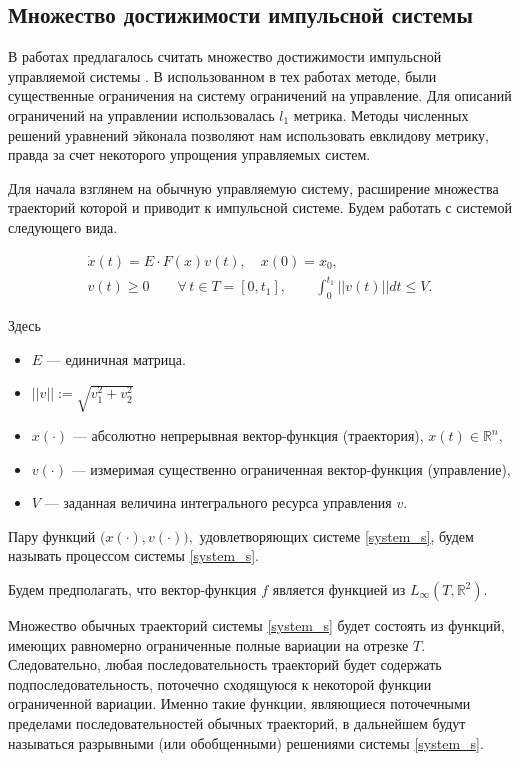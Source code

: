 \subsection{Множество достижимости импульсной системы}
\label{sec:ids}

В работах \cite{AVS2016, AV2015_1,AV2015_2} предлагалось считать
множество достижимости импульсной управляемой системы \cite{D2003}. В
использованном в тех работах методе, были существенные ограничения на
систему ограничений на управление. Для описаний ограничений на
управлении использовалась $l_1$ метрика. Методы численных решений
уравнений эйконала позволяют нам использовать евклидову метрику,
правда за счет некоторого упрощения управляемых систем.

Для начала взглянем на обычную управляемую систему, расширение
множества траекторий которой и приводит к импульсной системе. Будем
работать с системой следующего вида. 

\begin{equation}
  \label{system_s}
  \begin{array}{l}
    \dot{x}(t)=E \cdot F(x)v(t), \quad x(0)=x_0, \\[8pt]
    v(t)\geq 0  \qquad \forall\, t\in T = [0,t_1], \qquad
    \displaystyle\int_{0}^{t_1} ||v(t)||dt\leq V.
  \end{array} 
\end{equation}

Здесь
\begin{itemize}
  \item $E$ --- единичная матрица.
  \item $||v||:=\sqrt{v_1^2+v_2^2}$
  \item $x(\cdot)$ --- абсолютно непрерывная вектор-функция
    (траектория), $x(t)\in {\mathbb R}^n,$
  \item $v(\cdot)$ --- измеримая существенно ограниченная
    вектор-функция (управление),
  
  \item $V$ --- заданная величина интегрального ресурса управления
    $v$.
\end{itemize}

Пару функций $\bigl(x(\cdot),v(\cdot)\bigr),$ удовлетворяющих
системе \eqref{system_s}, будем называть процессом системы \eqref{system_s}.

Будем предполагать, что вектор-функция $f$ является функцией из
$L_{\infty}(T,\mathbb{R}^2)$.
     
Множество обычных траекторий системы \eqref{system_s} будет состоять
из функций, имеющих равномерно ограниченные полные вариации на отрезке
$T$. Следовательно, любая последовательность траекторий будет
содержать подпоследовательность, поточечно сходящуюся к некоторой
функции ограниченной вариации. Именно такие функции, являющиеся
поточечными пределами последовательностей обычных траекторий, в
дальнейшем будут называться разрывными (или обобщенными) решениями
системы \eqref{system_s}.

